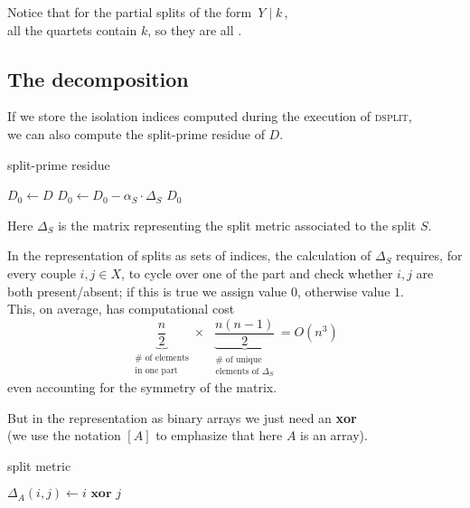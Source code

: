 \documentclass[./main.tex]{subfiles}
\begin{document}
Notice that for the partial splits of the form $\, Y \mathbin{|} k \,$, \\
\bsp all the quartets contain $k$, so they are all .

\clearpage


\subsection*{The decomposition}

If we store the isolation indices computed during the execution of \textsc{dsplit}, \\
we can also compute the split-prime residue of $D$.\medskip

\begin{algorithm}
\caption{split-prime residue}
\begin{algorithmic}[1]
        \State $D_0 \gets D$
            \State $D_0 \gets D_0 - \alpha_S \cdot \Delta_S$
        \EndFor
        \State \Return $D_0$
    \EndFunction
\end{algorithmic}
\end{algorithm}\bigskip\medskip

Here $\Delta_S$ is the matrix representing the split metric associated to the split $S$.

In the representation of splits as sets of indices, the calculation of $\Delta_S$ requires, for every couple $i,j \in X$, to cycle over one of the part and check whether $i,j$ are both present/absent; if this is true we assign value $0$, otherwise value $1$. \\
This, on average, has computational cost
\[ \underbrace{\frac{n}{2}}_{\substack{\text{$\#$ of elements} \\ \text{in one part}}} \!\!\times\ \ \underbrace{\frac{n(n-1)}{2}}_{\substack{\text{$\#$ of unique} \\ \text{elements of $\Delta_S$}}} = O(n^3) \]
even accounting for the symmetry of the matrix.

But in the representation as binary arrays we just need an \textbf{xor} \\
(we use the notation $[A]$ to emphasize that here $A$ is an array).\medskip

\begin{algorithm}
\caption{split metric}
\begin{algorithmic}[1]
                \State $\Delta_A(i,j) \gets i \textbf{ xor } j$
            \EndFor
        \EndFor
    \EndFunction
\end{algorithmic}
\end{algorithm}\medskip
\end{document}

